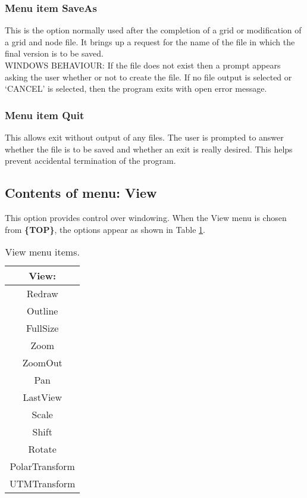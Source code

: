 \documentclass{article}
\begin{document}
\subsubsection[Menu item SaveAs]{Menu item SaveAs}
This is the option normally used after the completion of a grid or modification of a grid and node file. It brings up a request for the name of the file in which the final version is to be saved. \\
WINDOWS BEHAVIOUR: If the file does not exist then a prompt appears asking the user whether or not to create the file. If no file output is selected or `CANCEL' is selected, then the program exits with open error message.

\subsubsection[Menu item Quit]{Menu item Quit}
This allows exit without output of any files. The user is prompted to answer whether the file is to be saved and whether an exit is really desired. This helps prevent accidental termination of the program.


\subsection{Contents of menu: View}
This option provides control over windowing. When the View menu is chosen from \textbf{\{TOP\}}, the options appear as shown in Table \ref{tab:VIEW}.

\begin{table}[htb!]
 \caption{View menu items.}
  \begin{center}
   \begin{tabular}{|c|}
    \hline
View:\\     \hline
Redraw \\ Outline \\    \hline
FullSize \\ Zoom \\ ZoomOut \\ Pan \\ LastView \\    \hline
Scale \\ Shift \\ Rotate \\    \hline
PolarTransform \\  UTMTransform \\
    \hline
   \end{tabular}
   \label{tab:VIEW}
  \end{center}
\end{table}
\end{document}
